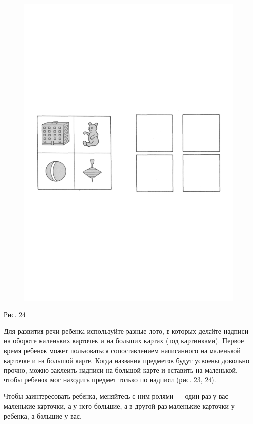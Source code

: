 \documentclass[a5paper]{book}
\begin{document}
\begin{figure}
\centering
\includegraphics[width=\linewidth]{media/media/image21.png}
\end{figure}

Рис. 24

Для развития речи ребенка используйте разные лото, в которых делайте
надписи на обороте маленьких карточек и на больших картах (под
картинками). Первое время ребенок может пользоваться сопоставлением
написанного на маленькой карточке и на большой карте. Когда названия
предметов будут усвоены довольно прочно, можно заклеить надписи на
большой карте и оставить на маленькой, чтобы ребенок мог находить
предмет только по надписи (рис. 23, 24).

Чтобы заинтересовать ребенка, меняйтесь с ним ролями --- один раз у вас
маленькие карточки, а у него большие, а в другой раз маленькие карточки
у ребенка, а большие у вас.
\end{document}

